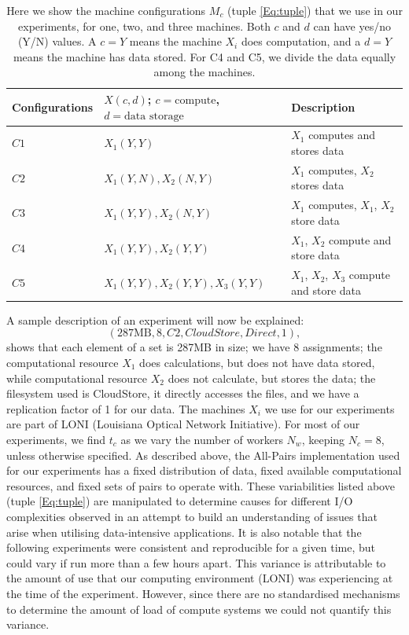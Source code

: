 \documentclass{rspublic}
\begin{document}
\begin{table}
\begin{center}
    \begin{tabular}{ | l | l | l |}
    \hline
    Configurations & $X(c,d)$; $c= \mbox{compute}$, $d=\mbox{data storage}$ & Description  \\ \hline
    $C1$ & $X_1(Y,Y)$  & $X_1$ computes and stores data\\ \hline    
    $C2$ & $X_1(Y,N), X_2(N,Y)$  & $X_1$ computes, $X_2$ stores data \\ \hline
    $C3$ & $X_1(Y,Y), X_2(N,Y)$  & $X_1$ computes, $X_1$, $X_2$ store data \\ \hline
    $C4$ & $X_1(Y,Y), X_2(Y,Y)$  & $X_1$, $X_2$ compute and store data \\ \hline
    $C5$ & $X_1(Y,Y), X_2(Y,Y), X_3(Y,Y)$  & $X_1$, $X_2$, $X_3$ compute and store data \\ 
    \hline
    \end{tabular}
\end{center}
    \caption{Here we show the machine configurations $M_c$ (tuple
\ref{Eq:tuple}) that we use in our experiments, for one, two, and three
machines. Both $c$ and $d$ can have yes/no (Y/N) values. A $c = Y$ means
the machine $X_i$ does computation, and a $d = Y$ means the machine has
data stored. For C4 and C5, we divide the data equally among the
machines.}
    \label{Tab:Configs}
\end{table}


A sample description of an experiment will now be explained:
 \begin{equation}
(287\mbox{MB}, 8, C2, CloudStore, Direct, 1),
\end{equation}
shows that each element of a set is 287MB in size; we have 8
assignments; the computational resource $X_1$ does calculations, but
does not have data stored, while computational resource $X_2$ does not
calculate, but stores the data; the filesystem used is CloudStore, it
directly accesses the files, and we have a replication factor of 1 for our
data. The machines $X_i$ we use for our experiments are part of LONI
(Louisiana Optical Network Initiative). For most of our experiments, we
find $t_c$ as we vary the number of workers $N_w$, keeping $N_c=8$,
 unless otherwise specified. As described
above, the All-Pairs implementation used for our experiments has a fixed
distribution of data, fixed available computational resources, and fixed
sets of pairs to operate with. These variabilities listed above (tuple
\ref{Eq:tuple}) are manipulated to determine causes for different I/O
complexities observed in an attempt to build an understanding of issues
that arise when utilising data-intensive applications. It is also
notable that the following experiments were consistent and reproducible
for a given time, but could vary if run more than a few hours apart.
This variance is attributable to the amount of use that our computing
environment (LONI) was experiencing at the time of the experiment.
However, since there are no standardised mechanisms to determine the
amount of load of compute systems we could not quantify this variance.
\end{document}
